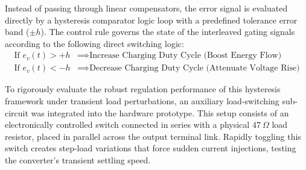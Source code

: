 Instead of passing through linear compensators, the error signal is evaluated directly by a hysteresis comparator logic loop with a predefined tolerance error band ($\pm h$). The control rule governs the state of the interleaved gating signals according to the following direct switching logic:
\begin{align}
    \text{If } e_v(t) > +h &\implies \text{Increase Charging Duty Cycle (Boost Energy Flow)} \\
    \text{If } e_v(t) < -h &\implies \text{Decrease Charging Duty Cycle (Attenuate Voltage Rise)}
\end{align}

To rigorously evaluate the robust regulation performance of this hysteresis framework under transient load perturbations, an auxiliary load-switching sub-circuit was integrated into the hardware prototype.
\newpage
This setup consists of an electronically controlled switch connected in series with a physical $47\ \Omega$ load resistor, placed in parallel across the output terminal link. Rapidly toggling this switch creates step-load variations that force sudden current injections, testing the converter's transient settling speed.

